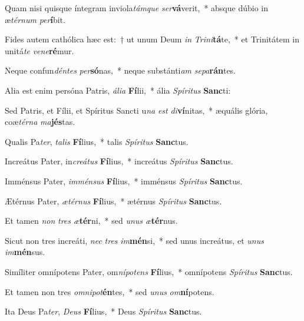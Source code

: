\item Quam nisi quisque íntegram inviola\textit{tám}\textit{que} \textit{ser}\textbf{vá}verit,~* absque dúbio in æ\textit{tér}\textit{num} \textit{per}\textbf{í}bit.
\item Fides autem cathólica hæc est:~† ut unum Deum \textit{in} \textit{Tri}\textit{ni}\textbf{tá}te,~* et Trinitátem in unitá\textit{te} \textit{ve}\textit{ne}\textbf{ré}mur.
\item Neque confun\textit{dén}\textit{tes} \textit{per}\textbf{só}nas,~* neque substánti\textit{am} \textit{se}\textit{pa}\textbf{rán}tes.
\item Alia est enim persóna Patris, \textit{á}\textit{li}\textit{a} \textbf{Fí}lii,~* ália \textit{Spí}\textit{ri}\textit{tus} \textbf{Sanc}ti:
\item Sed Patris, et Fílii, et Spíritus Sancti u\textit{na} \textit{est} \textit{di}\textbf{ví}nitas,~* æquális glória, coæ\textit{tér}\textit{na} \textit{ma}\textbf{jés}tas.
\item Qualis Pa\textit{ter}, \textit{ta}\textit{lis} \textbf{Fí}lius,~* talis \textit{Spí}\textit{ri}\textit{tus} \textbf{Sanc}tus.
\item Increátus Pater, in\textit{cre}\textit{á}\textit{tus} \textbf{Fí}lius,~* increátus \textit{Spí}\textit{ri}\textit{tus} \textbf{Sanc}tus.
\item Imménsus Pater, \textit{im}\textit{mén}\textit{sus} \textbf{Fí}lius,~* imménsus \textit{Spí}\textit{ri}\textit{tus} \textbf{Sanc}tus.
\item Ætérnus Pater, \textit{æ}\textit{tér}\textit{nus} \textbf{Fí}lius,~* ætérnus \textit{Spí}\textit{ri}\textit{tus} \textbf{Sanc}tus.
\item Et tamen \textit{non} \textit{tres} \textit{æ}\textbf{tér}ni,~* sed \textit{u}\textit{nus} \textit{æ}\textbf{tér}nus.
\item Sicut non tres increáti, \textit{nec} \textit{tres} \textit{im}\textbf{mén}si,~* sed unus increátus, et \textit{u}\textit{nus} \textit{im}\textbf{mén}sus.
\item Simíliter omnípotens Pater, om\textit{ní}\textit{pot}\textit{ens} \textbf{Fí}lius,~* omnípotens \textit{Spí}\textit{ri}\textit{tus} \textbf{Sanc}tus.
\item Et tamen non tres \textit{om}\textit{ni}\textit{pot}\textbf{én}tes,~* sed \textit{u}\textit{nus} \textit{om}\textbf{ní}potens.
\item Ita Deus Pa\textit{ter}, \textit{De}\textit{us} \textbf{Fí}lius,~* Deus \textit{Spí}\textit{ri}\textit{tus} \textbf{Sanc}tus.
